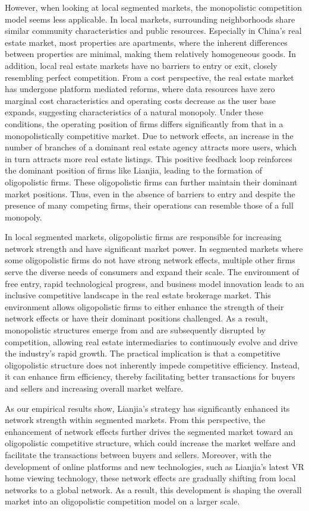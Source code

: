 \documentclass[11pt]{article}
\begin{document}
However, when looking at local segmented markets, the monopolistic competition model seems less applicable. In local markets, surrounding neighborhoods share similar community characteristics and public resources. Especially in China's real estate market, most properties are apartments, where the inherent differences between properties are minimal, making them relatively homogeneous goods. In addition, local real estate markets have no barriers to entry or exit, closely resembling perfect competition. From a cost perspective, the real estate market has undergone platform mediated reforms, where data resources have zero marginal cost characteristics and operating costs decrease as the user base expands, suggesting characteristics of a natural monopoly. Under these conditions, the operating position of firms differs significantly from that in a monopolistically competitive market. Due to network effects, an increase in the number of branches of a dominant real estate agency attracts more users, which in turn attracts more real estate listings. This positive feedback loop reinforces the dominant position of firms like Lianjia, leading to the formation of oligopolistic firms. These oligopolistic firms can further maintain their dominant market positions. Thus, even in the absence of barriers to entry and despite the presence of many competing firms, their operations can resemble those of a full monopoly.

In local segmented markets, oligopolistic firms are responsible for increasing network strength and have significant market power. In segmented markets where some oligopolistic firms do not have strong network effects, multiple other firms serve the diverse needs of consumers and expand their scale. The environment of free entry, rapid technological progress, and business model innovation leads to an inclusive competitive landscape in the real estate brokerage market. This environment allows oligopolistic firms to either enhance the strength of their network effects or have their dominant positions challenged. As a result, monopolistic structures emerge from and are subsequently disrupted by competition, allowing real estate intermediaries to continuously evolve and drive the industry's rapid growth. The practical implication is that a competitive oligopolistic structure does not inherently impede competitive efficiency. Instead, it can enhance firm efficiency, thereby facilitating better transactions for buyers and sellers and increasing overall market welfare.

As our empirical results show, Lianjia's strategy has significantly enhanced its network strength within segmented markets. From this perspective, the enhancement of network effects further drives the segmented market toward an oligopolistic competitive structure, which could increase the market welfare and facilitate the transactions between buyers and sellers. Moreover, with the development of online platforms and new technologies, such as Lianjia's latest VR home viewing technology, these network effects are gradually shifting from local networks to a global network. As a result, this development is shaping the overall market into an oligopolistic competition model on a larger scale.
\end{document}
